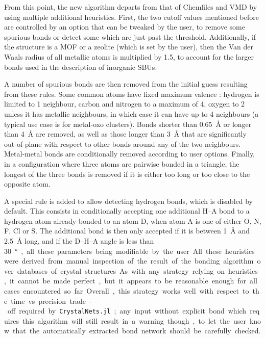\documentclass[main.tex]{subfiles}
\begin{document}
From this point, the new algorithm departs from that of Chemfiles and VMD by using multiple additional heuristics. First, the two cutoff values mentioned before are controlled by an option that can be tweaked by the user, to remove some spurious bonds or detect some which are just past the threshold. Additionally, if the structure is a MOF or a zeolite (which is set by the user), then the Van der Waals radius of all metallic atoms is multiplied by 1.5, to account for the larger bonds used in the description of inorganic SBUs.

A number of spurious bonds are then removed from the initial guess resulting from these rules. Some common atoms have fixed maximum valence : hydrogen is limited to 1 neighbour, carbon and nitrogen to a maximum of 4, oxygen to 2 unless it has metallic neighbours, in which case it can have up to 4 neighbours (a typical use case is for metal-oxo clusters). Bonds shorter than \qty{0.65}{\angstrom} or longer than \qty{4}{\angstrom} are removed, as well as those longer than \qty{3}{\angstrom} that are significantly out-of-plane with respect to other bonds around any of the two neighbours. Metal-metal bonds are conditionally removed according to user options. Finally, in a configuration where three atoms are pairwise bonded in a triangle, the longest of the three bonds is removed if it is either too long or too close to the opposite atom.

A special rule is added to allow detecting hydrogen bonds, which is disabled by default. This consists in conditionally accepting one additional H--A bond to a hydrogen atom already bonded to an atom D, when atom A is one of either O, N, F, Cl or S. The additional bond is then only accepted if it is between \qty{1}{\angstrom} and \qty{2.5}{\angstrom} long, and if the D--H--A angle is less than \qty{30}\degree, all these parameters being modifiable by the user.

All these heuristics were derived from manual inspection of the result of the bonding algorithm over databases of crystal structures. As with any strategy relying on heuristics, it cannot be made perfect, but it appears to be reasonable enough for all cases encountered so far. Overall, this strategy works well with respect to the time vs precision trade-off required by \texttt{CrystalNets.jl}; any input without explicit bond which requires this algorithm will still result in a warning though, to let the user know that the automatically extracted bond network should be carefully checked.
\end{document}
